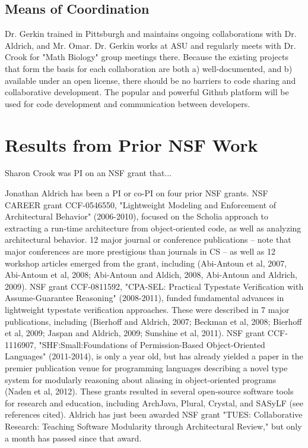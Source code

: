 \documentclass[a4paper,12pt]{article}
\begin{document}
\subsection{Means of Coordination}
Dr. Gerkin trained in Pittsburgh and maintains ongoing collaborations with Dr. Aldrich, and Mr. Omar.  Dr. Gerkin works at ASU and regularly meets with Dr. Crook for "Math Biology" group meetings there.  Because the existing projects that form the basis for each collaboration are both a) well-documented, and b) available under an open license, there should be no barriers to code sharing and collaborative development.  The popular and powerful Github platform will be used for code development and communication between developers.

\section{Results from Prior NSF Work}
Sharon Crook was PI on an NSF grant that... 

Jonathan Aldrich has been a PI or co-PI on four prior NSF grants.  NSF CAREER grant CCF-0546550, "Lightweight Modeling and Enforcement of Architectural Behavior" (2006-2010), focused on the Scholia approach to extracting a run-time architecture from object-oriented code, as well as analyzing architectural behavior.  12 major journal or conference publications -- note that major conferences are more prestigious than journals in CS -- as well as 12 workshop articles emerged from the grant, including (Abi-Antoun et al, 2007, Abi-Antoun et al, 2008; Abi-Antoun and Aldich, 2008, Abi-Antoun and Aldrich, 2009).  NSF grant CCF-0811592, "CPA-SEL: Practical Typestate Verification with Assume-Guarantee Reasoning" (2008-2011), funded fundamental advances in lightweight typestate verification approaches.  These were described in 7 major publications, including (Bierhoff and Aldrich, 2007; Beckman et al, 2008; Bierhoff et al, 2009; Jaspan and Aldrich, 2009; Sunshine et al, 2011).  NSF grant CCF-1116907, "SHF:Small:Foundations of Permission-Based Object-Oriented Languages" (2011-2014), is only a year old, but has already yielded a paper in the premier publication venue for programming languages describing a novel type system for modularly reasoning about aliasing in object-oriented programs (Naden et al, 2012).  These grants resulted in several open-source software tools for research and education, including ArchJava, Plural, Crystal, and SASyLF (see references cited).  Aldrich has just been awarded NSF grant "TUES: Collaborative Research: Teaching Software Modularity through Architectural Review," but only a month has passed since that award.
\end{document}
